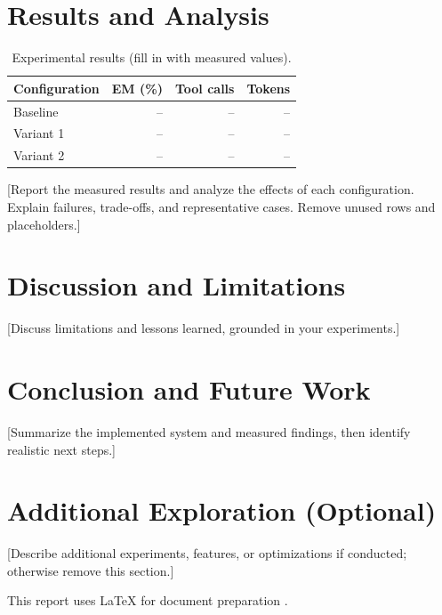 \documentclass[sigconf]{acmart}
\begin{document}
\section{Results and Analysis}
\begin{table}[t]
  \centering
  \caption{Experimental results (fill in with measured values).}
  \label{tab:results}
  \begin{tabular}{lrrr}
    \toprule
    Configuration & EM (\%) & Tool calls & Tokens \\
    \midrule
    Baseline & -- & -- & -- \\
    Variant 1 & -- & -- & -- \\
    Variant 2 & -- & -- & -- \\
    \bottomrule
  \end{tabular}
\end{table}
[Report the measured results and analyze the effects of each configuration. Explain failures,
trade-offs, and representative cases. Remove unused rows and placeholders.]

\section{Discussion and Limitations}
[Discuss limitations and lessons learned, grounded in your experiments.]

\section{Conclusion and Future Work}
[Summarize the implemented system and measured findings, then identify realistic next steps.]

\section{Additional Exploration (Optional)}
[Describe additional experiments, features, or optimizations if conducted; otherwise remove this section.]





This report uses LaTeX for document preparation \cite{lamport1986latex}.
\end{document}
